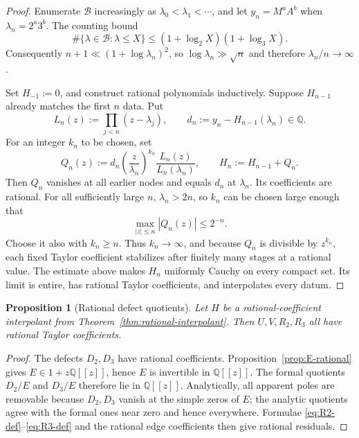 \documentclass[11pt]{article}
\newtheorem{proposition}[theorem]{Proposition}
\theoremstyle{definition}
\newcommand{\Q}{\mathbb Q}
\newcommand{\cB}{\mathcal B}
\begin{document}
\begin{proof}
Enumerate \(\cB\) increasingly as \(\lambda_0<\lambda_1<\cdots\), and let \(y_n=M^aA^b\) when \(\lambda_n=2^a3^b\).  The counting bound
\[
  \#\{\lambda\in\cB:\lambda\le X\}
  \le\left(1+\log_2 X\right)
      \left(1+\log_3 X\right).
\]
Consequently \(n+1\ll(1+\log\lambda_n)^2\), so
\(\log\lambda_n\gg\sqrt n\) and therefore \(\lambda_n/n\to\infty\).

Set \(H_{-1}:=0\), and construct rational polynomials inductively.  Suppose \(H_{n-1}\) already matches the first \(n\) data.  Put
\[
  L_n(z):=\prod_{j<n}(z-\lambda_j),
  \qquad
  d_n:=y_n-H_{n-1}(\lambda_n)\in\Q.
\]
For an integer \(k_n\) to be chosen, set
\begin{equation}\label{eq:rational-correction}
  Q_n(z):=
  d_n\left(\frac{z}{\lambda_n}\right)^{k_n}
  \frac{L_n(z)}{L_n(\lambda_n)},
  \qquad
  H_n:=H_{n-1}+Q_n.
\end{equation}
Then \(Q_n\) vanishes at all earlier nodes and equals \(d_n\) at \(\lambda_n\).  Its coefficients are rational.  For all sufficiently large \(n\), \(\lambda_n>2n\), so \(k_n\) can be chosen large enough that
\[
  \max_{|z|\le n}|Q_n(z)|\le2^{-n}.
\]
Choose it also with \(k_n\ge n\).  Thus \(k_n\to\infty\), and because \(Q_n\) is divisible by \(z^{k_n}\), each fixed Taylor coefficient stabilizes after finitely many stages at a rational value.  The estimate above makes \(H_n\) uniformly Cauchy on every compact set.  Its limit is entire, has rational Taylor coefficients, and interpolates every datum.
\end{proof}

\begin{proposition}[Rational defect quotients]\label{prop:rational-quotients}
Let \(H\) be a rational-coefficient interpolant from Theorem~\ref{thm:rational-interpolant}.  Then \(U,V,R_2,R_3\) all have rational Taylor coefficients.
\end{proposition}

\begin{proof}
The defects \(D_2,D_3\) have rational coefficients.  Proposition~\ref{prop:E-rational} gives \(E\in1+z\Q[[z]]\), hence \(E\) is invertible in \(\Q[[z]]\).  The formal quotients \(D_2/E\) and \(D_3/E\) therefore lie in \(\Q[[z]]\).  Analytically, all apparent poles are removable because \(D_2,D_3\) vanish at the simple zeros of \(E\); the analytic quotients agree with the formal ones near zero and hence everywhere.  Formulae \eqref{eq:R2-def}--\eqref{eq:R3-def} and the rational edge coefficients then give rational residuals.
\end{proof}
\end{document}

